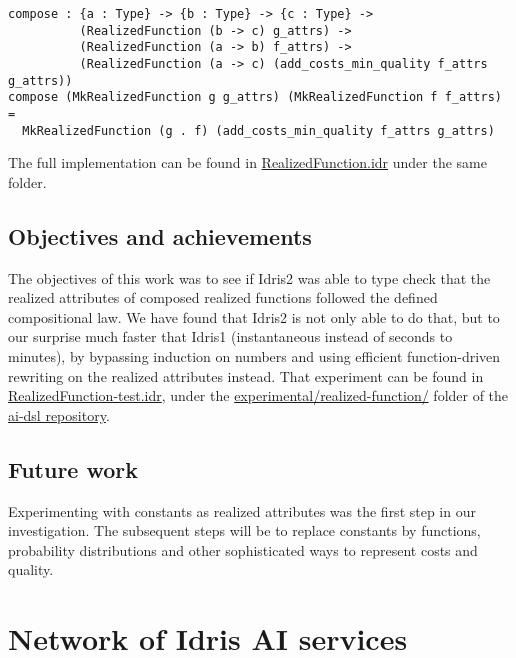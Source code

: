 \documentclass[]{report}
\begin{document}
\begin{verbatim}
compose : {a : Type} -> {b : Type} -> {c : Type} ->
          (RealizedFunction (b -> c) g_attrs) ->
          (RealizedFunction (a -> b) f_attrs) ->
          (RealizedFunction (a -> c) (add_costs_min_quality f_attrs g_attrs))
compose (MkRealizedFunction g g_attrs) (MkRealizedFunction f f_attrs) =
  MkRealizedFunction (g . f) (add_costs_min_quality f_attrs g_attrs)
\end{verbatim}
The full implementation can be found in
\href{https://github.com/singnet/ai-dsl/blob/master/experimental/realized-function/RealizedFunction.idr}{RealizedFunction.idr}
under the same folder.

\subsection{Objectives and achievements}

The objectives of this work was to see if Idris2 was able to type
check that the realized attributes of composed realized functions
followed the defined compositional law.  We have found that Idris2 is
not only able to do that, but to our surprise much faster that Idris1
(instantaneous instead of seconds to minutes), by bypassing induction
on numbers and using efficient function-driven rewriting on the
realized attributes instead.  That experiment can be found in
\href{https://github.com/singnet/ai-dsl/blob/master/experimental/realized-function/RealizedFunction-test.idr}{RealizedFunction-test.idr},
under the
\href{https://github.com/singnet/ai-dsl/blob/master/experimental/realized-function/}{experimental/realized-function/}
folder of the \href{https://github.com/singnet/ai-dsl/}{ai-dsl
  repository}.

\subsection{Future work}

Experimenting with constants as realized attributes was the first step
in our investigation.  The subsequent steps will be to replace
constants by functions, probability distributions and other
sophisticated ways to represent costs and quality.

\section{Network of Idris AI services}
\label{network_idris_ai_services}
\end{document}
